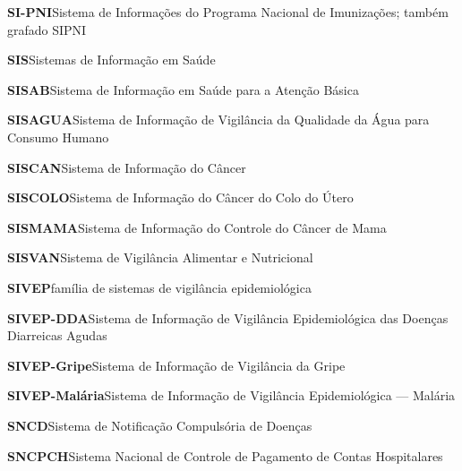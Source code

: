 \noindent\textbf{SI-PNI}\hspace{1em}Sistema de Informações do Programa Nacional de Imunizações; também grafado SIPNI\par\smallskip
\noindent\textbf{SIS}\hspace{1em}Sistemas de Informação em Saúde\par\smallskip
\noindent\textbf{SISAB}\hspace{1em}Sistema de Informação em Saúde para a Atenção Básica\par\smallskip
\noindent\textbf{SISAGUA}\hspace{1em}Sistema de Informação de Vigilância da Qualidade da Água para Consumo Humano\par\smallskip
\noindent\textbf{SISCAN}\hspace{1em}Sistema de Informação do Câncer\par\smallskip
\noindent\textbf{SISCOLO}\hspace{1em}Sistema de Informação do Câncer do Colo do Útero\par\smallskip
\noindent\textbf{SISMAMA}\hspace{1em}Sistema de Informação do Controle do Câncer de Mama\par\smallskip
\noindent\textbf{SISVAN}\hspace{1em}Sistema de Vigilância Alimentar e Nutricional\par\smallskip
\noindent\textbf{SIVEP}\hspace{1em}família de sistemas de vigilância epidemiológica\par\smallskip
\noindent\textbf{SIVEP-DDA}\hspace{1em}Sistema de Informação de Vigilância Epidemiológica das Doenças Diarreicas Agudas\par\smallskip
\noindent\textbf{SIVEP-Gripe}\hspace{1em}Sistema de Informação de Vigilância da Gripe\par\smallskip
\noindent\textbf{SIVEP-Malária}\hspace{1em}Sistema de Informação de Vigilância Epidemiológica — Malária\par\smallskip
\noindent\textbf{SNCD}\hspace{1em}Sistema de Notificação Compulsória de Doenças\par\smallskip
\noindent\textbf{SNCPCH}\hspace{1em}Sistema Nacional de Controle de Pagamento de Contas Hospitalares\par\smallskip
